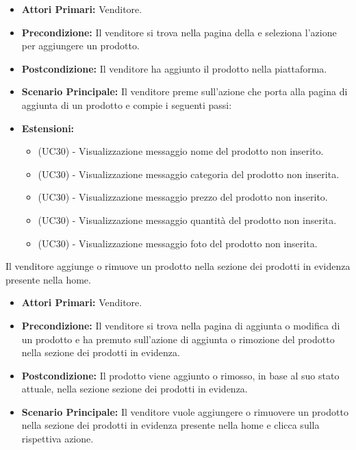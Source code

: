\resetSubUC



\begin{itemize}
    \item \textbf{Attori Primari:} Venditore.
    \item \textbf{Precondizione:} Il venditore si trova nella pagina della  e seleziona l'azione per aggiungere un prodotto.
    \item \textbf{Postcondizione:} Il venditore ha aggiunto il prodotto nella piattaforma.
    \item \textbf{Scenario Principale:} Il venditore preme sull'azione che porta alla pagina di aggiunta di un prodotto e compie i seguenti passi:
    \item \textbf{Estensioni:}
    \begin{itemize}
        \item (UC30) - Visualizzazione messaggio nome del prodotto non inserito.
        \item (UC30) - Visualizzazione messaggio categoria del prodotto non inserita.
        \item (UC30) - Visualizzazione messaggio prezzo del prodotto non inserito.
        \item (UC30) - Visualizzazione messaggio quantità del prodotto non inserita.
        \item (UC30) - Visualizzazione messaggio foto del prodotto non inserita.
    \end{itemize}
\end{itemize}


Il venditore aggiunge o rimuove un prodotto nella sezione dei prodotti in evidenza presente nella home.
\begin{itemize}
    \item \textbf{Attori Primari:} Venditore.
    \item \textbf{Precondizione:} Il venditore si trova nella pagina di aggiunta o modifica di un prodotto e ha premuto sull'azione di aggiunta o rimozione del prodotto nella sezione dei prodotti in evidenza.
    \item \textbf{Postcondizione:} Il prodotto viene aggiunto o rimosso, in base al suo stato attuale, nella sezione sezione dei prodotti in evidenza. 
    \item \textbf{Scenario Principale:} Il venditore vuole aggiungere o rimuovere un prodotto nella sezione dei prodotti in evidenza presente nella home e clicca sulla rispettiva azione.
\end{itemize}

